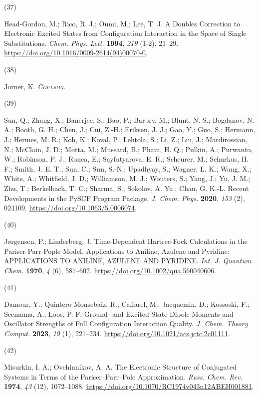 \documentclass[
  number,
  3p]{elsarticle}
\newlength{\cslhangindent}
\newlength{\csllabelwidth}
\newlength{\cslentryspacingunit} %
\newenvironment{CSLReferences}[2] %
 {%
  \setlength{\parindent}{0pt}
  \ifodd #1
  \let\oldpar\par
  \def\par{\hangindent=\cslhangindent\oldpar}
  \fi
  \setlength{\parskip}{#2\cslentryspacingunit}
 }%
 {}
\newcommand{\CSLLeftMargin}[1]{\parbox[t]{\csllabelwidth}{#1}}
\newcommand{\CSLRightInline}[1]{\parbox[t]{\linewidth - \csllabelwidth}{#1}\break}
\begin{document}
\begin{CSLReferences}{0}{0}
\leavevmode{}%
\CSLLeftMargin{(37) }%
\CSLRightInline{Head-Gordon, M.; Rico, R. J.; Oumi, M.; Lee, T. J. A
Doubles Correction to Electronic Excited States from Configuration
Interaction in the Space of Single Substitutions. \emph{Chem. Phys.
Lett.} \textbf{1994}, \emph{219} (1-2), 21--29.
\url{https://doi.org/10.1016/0009-2614(94)00070-0}.}

\leavevmode{}%
\CSLLeftMargin{(38) }%
\CSLRightInline{Jorner, K.
\emph{\href{https://github.com/kjelljorner/coulson}{\textsc{Coulson}}}.}

\leavevmode{}%
\CSLLeftMargin{(39) }%
\CSLRightInline{Sun, Q.; Zhang, X.; Banerjee, S.; Bao, P.; Barbry, M.;
Blunt, N. S.; Bogdanov, N. A.; Booth, G. H.; Chen, J.; Cui, Z.-H.;
Eriksen, J. J.; Gao, Y.; Guo, S.; Hermann, J.; Hermes, M. R.; Koh, K.;
Koval, P.; Lehtola, S.; Li, Z.; Liu, J.; Mardirossian, N.; McClain, J.
D.; Motta, M.; Mussard, B.; Pham, H. Q.; Pulkin, A.; Purwanto, W.;
Robinson, P. J.; Ronca, E.; Sayfutyarova, E. R.; Scheurer, M.; Schurkus,
H. F.; Smith, J. E. T.; Sun, C.; Sun, S.-N.; Upadhyay, S.; Wagner, L.
K.; Wang, X.; White, A.; Whitfield, J. D.; Williamson, M. J.; Wouters,
S.; Yang, J.; Yu, J. M.; Zhu, T.; Berkelbach, T. C.; Sharma, S.;
Sokolov, A. Yu.; Chan, G. K.-L. Recent Developments in the {PySCF}
Program Package. \emph{J. Chem. Phys.} \textbf{2020}, \emph{153} (2),
024109. \url{https://doi.org/10.1063/5.0006074}.}

\leavevmode{}%
\CSLLeftMargin{(40) }%
\CSLRightInline{Jørgensen, P.; Linderberg, J. Time-Dependent
{Hartree-Fock} Calculations in the {Pariser-Parr-Pople} Model.
{Applications} to Aniline, Azulene and Pyridine: {APPLICATIONS TO
ANILINE}, {AZULENE AND PYRIDINE}. \emph{Int. J. Quantum Chem.}
\textbf{1970}, \emph{4} (6), 587--602.
\url{https://doi.org/10.1002/qua.560040606}.}

\leavevmode{}%
\CSLLeftMargin{(41) }%
\CSLRightInline{Damour, Y.; Quintero-Monsebaiz, R.; Caffarel, M.;
Jacquemin, D.; Kossoski, F.; Scemama, A.; Loos, P.-F. Ground- and
{Excited-State Dipole Moments} and {Oscillator Strengths} of {Full
Configuration Interaction Quality}. \emph{J. Chem. Theory Comput.}
\textbf{2023}, \emph{19} (1), 221--234.
\url{https://doi.org/10.1021/acs.jctc.2c01111}.}

\leavevmode{}%
\CSLLeftMargin{(42) }%
\CSLRightInline{Misurkin, I. A.; Ovchinnikov, A. A. The {Electronic
Structure} of {Conjugated Systems} in {Terms} of the
{Pariser}--{Parr}--{Pole Approximation}. \emph{Russ. Chem. Rev.}
\textbf{1974}, \emph{43} (12), 1072--1088.
\url{https://doi.org/10.1070/RC1974v043n12ABEH001881}.}

\end{CSLReferences}
\end{document}
